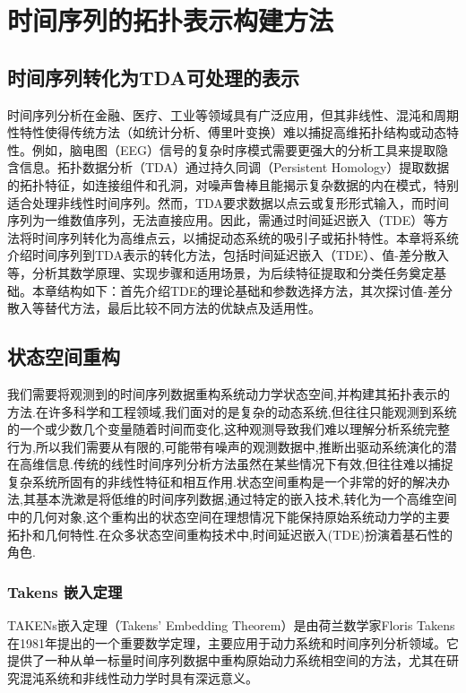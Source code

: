 \section{时间序列的拓扑表示构建方法}
\subsection{时间序列转化为TDA可处理的表示}
时间序列分析在金融、医疗、工业等领域具有广泛应用，但其非线性、混沌和周期性特性使得传统方法（如统计分析、傅里叶变换）难以捕捉高维拓扑结构或动态特性。例如，脑电图（EEG）信号的复杂时序模式需要更强大的分析工具来提取隐含信息。拓扑数据分析（TDA）通过持久同调（Persistent Homology）提取数据的拓扑特征，如连接组件和孔洞，对噪声鲁棒且能揭示复杂数据的内在模式，特别适合处理非线性时间序列。然而，TDA要求数据以点云或复形形式输入，而时间序列为一维数值序列，无法直接应用。因此，需通过时间延迟嵌入（TDE）等方法将时间序列转化为高维点云，以捕捉动态系统的吸引子或拓扑特性。本章将系统介绍时间序列到TDA表示的转化方法，包括时间延迟嵌入（TDE）、值-差分散入等，分析其数学原理、实现步骤和适用场景，为后续特征提取和分类任务奠定基础。本章结构如下：首先介绍TDE的理论基础和参数选择方法，其次探讨值-差分散入等替代方法，最后比较不同方法的优缺点及适用性。
\subsection{状态空间重构}
我们需要将观测到的时间序列数据重构系统动力学状态空间,并构建其拓扑表示的方法.在许多科学和工程领域,我们面对的是复杂的动态系统,但往往只能观测到系统的一个或少数几个变量随着时间而变化,这种观测导致我们难以理解分析系统完整行为,所以我们需要从有限的,可能带有噪声的观测数据中,推断出驱动系统演化的潜在高维信息.传统的线性时间序列分析方法虽然在某些情况下有效,但往往难以捕捉复杂系统所固有的非线性特征和相互作用.状态空间重构是一个非常的好的解决办法,其基本洗漱是将低维的时间序列数据,通过特定的嵌入技术,转化为一个高维空间中的几何对象,这个重构出的状态空间在理想情况下能保持原始系统动力学的主要拓扑和几何特性.在众多状态空间重构技术中,时间延迟嵌入(TDE)扮演着基石性的角色.
\subsubsection{Takens 嵌入定理}
TAKENs嵌入定理（Takens' Embedding Theorem）是由荷兰数学家Floris Takens在1981年提出的一个重要数学定理，主要应用于动力系统和时间序列分析领域。它提供了一种从单一标量时间序列数据中重构原始动力系统相空间的方法，尤其在研究混沌系统和非线性动力学时具有深远意义。

